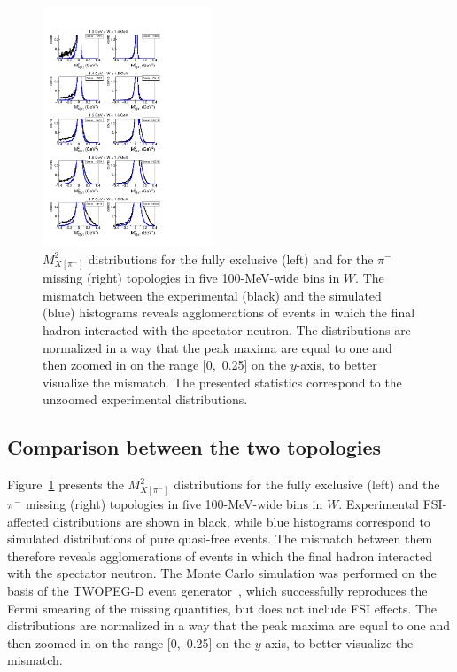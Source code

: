 \documentclass[prc,twocolumn,superscriptaddress,showpacs,amssymb,amsmath,amsfonts,aps,nofootinbib]{revtex4-1}
\begin{document}
\begin{figure}[htp]
\begin{center}
\includegraphics[width=0.45\textwidth]{pictures/fsi/top_comp2.pdf}
\caption{\small $M^{2}_{X[\pi^{-}]}$ distributions for the fully exclusive (left) and for the $\pi^{-}$ missing (right) topologies in five 100-MeV-wide bins in $W$. The mismatch between the experimental (black) and the simulated (blue) histograms reveals agglomerations of events in which the final hadron interacted with the spectator neutron. The distributions are normalized in a way that the peak maxima are equal to one and then zoomed in on the range [0,~0.25] on the $y$-axis, to better visualize the mismatch. The presented statistics correspond to the unzoomed experimental distributions.
} \label{fig:top_comp}
\end{center}
\end{figure}

\subsection{Comparison between the two topologies}
\label{sect:fsi_top_comp}



Figure~\ref{fig:top_comp} presents the $M^{2}_{X[\pi^{-}]}$ distributions for the fully exclusive (left) and the $\pi^{-}$ missing (right) topologies in five 100-MeV-wide bins in $W$. Experimental FSI-affected distributions are shown in black, while blue histograms correspond to simulated distributions of pure quasi-free events. The mismatch between them therefore reveals agglomerations of events in which the final hadron interacted with the spectator neutron. The Monte Carlo simulation was performed on the basis of the TWOPEG-D event generator~\cite{twopeg-d}, which successfully reproduces the Fermi smearing of the missing quantities, but does not include FSI effects. The distributions are normalized in a way that the peak maxima are equal to one and then zoomed in on the range [0,~0.25] on the $y$-axis, to better visualize the mismatch.
\end{document}
